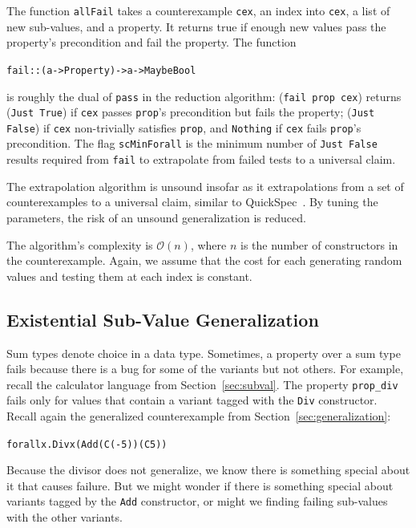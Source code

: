\documentclass{sigplanconf}
\newenvironment{code}{\begin{alltt}}{\end{alltt}}
\newcommand{\ttp}[1]{\texttt{#1}}
\begin{document}
The function \ttp{allFail} takes a counterexample \ttp{cex}, an index into
\ttp{cex}, a list of new sub-values, and a property.  It returns true if enough
new values pass the property's precondition and fail the property.  The function
%
\begin{code}
fail :: (a -> Property) -> a -> Maybe Bool
\end{code}
%
\noindent
is roughly the dual of \ttp{pass} in the reduction algorithm: (\ttp{fail
  prop cex}) returns (\ttp{Just True}) if \ttp{cex} passes \ttp{prop}'s
precondition but fails the property; (\ttp{Just False}) if \ttp{cex}
non-trivially satisfies \ttp{prop}, and \ttp{Nothing} if \ttp{cex} fails
\ttp{prop}'s precondition.  The flag \ttp{scMinForall} is the minimum number
of \ttp{Just False} results required from \ttp{fail} to extrapolate from failed
tests to a universal claim.

The extrapolation algorithm is unsound insofar as it extrapolations from a set
of counterexamples to a universal claim, similar to QuickSpec~\cite{qs}.  By
tuning the parameters, the risk of an unsound generalization is reduced.

The algorithm's complexity is $\mathcal{O}(n)$, where $n$ is the number of
constructors in the counterexample.  Again, we assume that the cost for each
generating random values and testing them at each index is constant.


\subsection{Existential Sub-Value Generalization}

Sum types denote choice in a data type.  Sometimes, a property over a sum type
fails because there is a bug for some of the variants but not others.  For
example, recall the calculator language from Section~\ref{sec:subval}.  The
property \ttp{prop\_div} fails only for values that contain a variant tagged
with the \ttp{Div} constructor.  Recall again the generalized counterexample
from Section~\ref{sec:generalization}:
%
\begin{code}
forall x . Div x (Add (C (-5)) (C 5))
\end{code}
%
\noindent
Because the divisor does not generalize, we know there is something special
about it that causes failure.  But we might wonder if there is something special
about variants tagged by the \ttp{Add} constructor, or might we finding failing
sub-values with the other variants.
\end{document}
